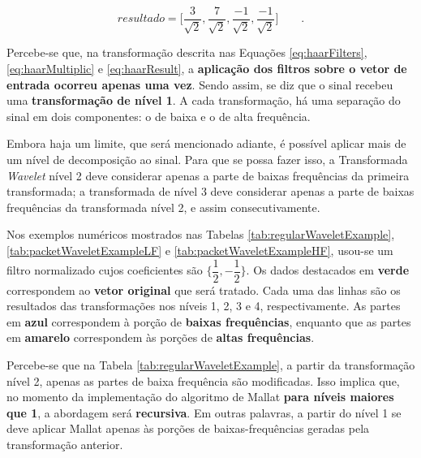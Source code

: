 			\begin{equation}
				resultado = \Big[
				\frac{3}{\sqrt{2}},
				\frac{7}{\sqrt{2}},
				\frac{-1}{\sqrt{2}},
				\frac{-1}{\sqrt{2}}
				\Big]\qquad.
				\label{eq:haarResult}
			\end{equation}
			
			\par Percebe-se que, na transformação descrita nas Equações \autoref{eq:haarFilters}, \autoref{eq:haarMultiplic} e \autoref{eq:haarResult}, a \textbf{aplicação dos filtros sobre o vetor de entrada ocorreu apenas uma vez}. Sendo assim, se diz que o sinal recebeu uma \textbf{transformação de nível 1}. A cada transformação, há uma separação do sinal em dois componentes: o de baixa e o de alta frequência.
	
			\par Embora haja um limite, que será mencionado adiante, é possível aplicar mais de um nível de decomposição ao sinal. Para que se possa fazer isso, a Transformada \textit{Wavelet} nível 2 deve considerar apenas a parte de baixas frequências da primeira transformada; a transformada de nível 3 deve considerar apenas a parte de baixas frequências da transformada nível 2, e assim consecutivamente.
			
			\par Nos exemplos numéricos mostrados nas Tabelas \autoref{tab:regularWaveletExample}, \autoref{tab:packetWaveletExampleLF} e \autoref{tab:packetWaveletExampleHF}, usou-se um filtro normalizado cujos coeficientes são $\{\dfrac{1}{2},-\dfrac{1}{2}\}$. Os dados destacados em \textbf{verde} correspondem ao \textbf{vetor original} que será tratado. Cada uma das linhas são os resultados das transformações nos níveis 1, 2, 3 e 4, respectivamente. As partes em \textbf{azul} correspondem à porção de \textbf{baixas frequências}, enquanto que as partes em \textbf{amarelo} correspondem às porções de \textbf{altas frequências}.
			
			\par Percebe-se que na Tabela \autoref{tab:regularWaveletExample}, a partir da transformação nível 2, apenas as partes de baixa frequência são modificadas. Isso implica que, no momento da implementação do algoritmo de Mallat \textbf{para níveis maiores que 1}, a abordagem será \textbf{recursiva}. Em outras palavras, a partir do nível 1 se deve aplicar Mallat apenas às porções de baixas-frequências geradas pela transformação anterior.
	
			
	
